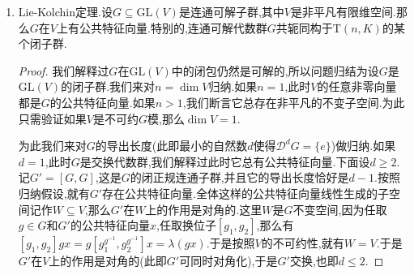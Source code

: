 \begin{enumerate}
\begin{enumerate}[(1)]
\begin{proof}
    		对$V$的维数做归纳,不妨设$V$是不可约$G$模(也即不能写成更小的$G$子模的直和).按照$G$是幂单的,任取$g\in G$就有$\mathrm{Tr}(g)=\mathrm{Tr}(1)=(\dim V)1_K$.类似的任取$g,h\in G$,从$g-e$幂零得到$\mathrm{Tr}(h)=\mathrm{Tr}(gh)=\mathrm{Tr}(h)+\mathrm{Tr}((g-1)h)$.进而$\mathrm{Tr}((g-1)h)=0$.设$G$在$K$线性下张成的$\mathrm{End}(V)$的子代数为$R$,那么有$\mathrm{Tr}((g-1)R)=0$.但是按照Burnside定理,$\mathrm{End}(V)$的一个子代数$R$如果在$V$上的作用是不可约的,那么必然有$R=\mathrm{End}(V)$.于是对任意$h\in\mathrm{End}(V)$都有$\mathrm{Tr}((g-1)h)=0$.这迫使$g-1=0$,也即$G=\{e\}$,此时不可约性导致$\dim V=1$.
    	\end{proof}
        \item 设$G\subseteq\mathrm{GL}(n,K)$是幂单子群,选取一维$G$不变子空间$V_1$,那么$G$作用在$V/V_1$上仍然是幂单的,反复归纳下去,就得到$G$共轭同构于$\mathrm{U}(n,K)$的子群.特别的,有$G$是幂零群.另外按照$\mathrm{U}(n,K)$是$\mathrm{GL}(n,K)$的闭子群,说明如果$H\le G$是代数群的幂单子群,那么$\overline{H}$也是幂单子群.
        \item 如果基域的特征$p\not=0$,那么$\mathrm{GL}(V)$中的一个自同构是幂单的当且仅当它的阶数是$p$的次幂.于是幂单群是幂零群推广了有限$p$群是幂零群这件事.
    \end{enumerate}
    \item Lie-Kolchin定理.设$G\subseteq\mathrm{GL}(V)$是连通可解子群,其中$V$是非平凡有限维空间.那么$G$在$V$上有公共特征向量.特别的,连通可解代数群$G$共轭同构于$\mathrm{T}(n,K)$的某个闭子群.
    \begin{proof}
    	
    	我们解释过$G$在$\mathrm{GL}(V)$中的闭包仍然是可解的,所以问题归结为设$G$是$\mathrm{GL}(V)$的闭子群.我们来对$n=\dim V$归纳.如果$n=1$,此时$V$的任意非零向量都是$G$的公共特征向量.如果$n>1$,我们断言它总存在非平凡的不变子空间.为此只需验证如果$V$是不可约$G$模,那么$\dim V=1$.
    	
    	\qquad
    	
    	为此我们来对$G$的导出长度(此即最小的自然数$d$使得$\mathscr{D}^dG=\{e\}$)做归纳.如果$d=1$,此时$G$是交换代数群,我们解释过此时它总有公共特征向量.下面设$d\ge2$.记$G'=[G,G]$,这是$G$的闭正规连通子群,并且它的导出长度恰好是$d-1$.按照归纳假设,就有$G'$存在公共特征向量.全体这样的公共特征向量线性生成的子空间记作$W\subseteq V$,那么$G'$在$W$上的作用是对角的.这里$W$是$G$不变空间,因为任取$g\in G$和$G'$的公共特征向量$x$,任取换位子$[g_1,g_2]$,那么有$[g_1,g_2]gx=g[g_1^{g^{-1}},g_2^{g^{-1}}]x=\lambda(gx)$.于是按照$V$的不可约性,就有$W=V$.于是$G'$在$V$上的作用是对角的(此即$G'$可同时对角化),于是$G'$交换,也即$d\le2$.
    	

\end{proof}
\end{enumerate}
